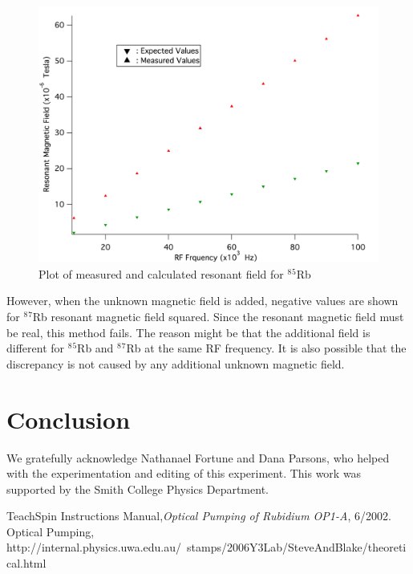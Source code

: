 \documentclass[prb,preprint]{revtex4-1}
\begin{document}
\begin{figure}[h]
\centering
\includegraphics[width=16cm]{calibration.png}
\caption{Plot of measured and calculated resonant field for $^8$$^5$Rb}
\label{caliplot}
\end{figure}

However, when the unknown magnetic field is added, negative values are shown for $^8$$^7$Rb resonant magnetic field squared. Since the resonant magnetic field must be real, this method fails. The reason might be that the additional field is different for $^8$$^5$Rb and $^8$$^7$Rb at the same RF frequency. It is also possible that the discrepancy is not caused by any additional unknown magnetic field. 


\section{Conclusion}


\begin{acknowledgments}

We gratefully acknowledge Nathanael Fortune and Dana Parsons, who helped with the experimentation and editing of this experiment.  This work was supported by the Smith College Physics Department.

\end{acknowledgments}


\begin{thebibliography}{99}

 TeachSpin Instructions Manual,\textit{Optical Pumping of Rubidium OP1-A}, 6/2002.
 Optical Pumping, http://internal.physics.uwa.edu.au/~stamps/2006Y3Lab/SteveAndBlake/theoretical.html

\end{thebibliography}

\end{document}
